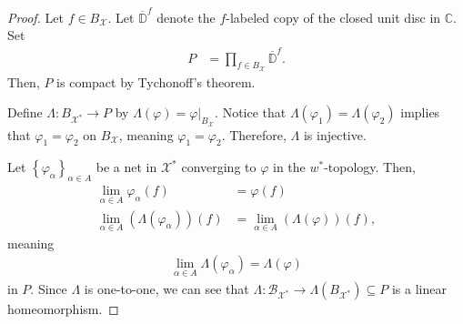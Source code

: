 \documentclass[12pt]{extarticle}
\newcommand{\C}{\mathbb{C}}
\newcommand{\set}[1]{\left\{#1\right\}}
\theoremstyle{plain}
\theoremstyle{definition}
\theoremstyle{note}
\renewcommand{\newline}{\hfill\break}
\begin{document}
\begin{proof}
  Let $f\in B_{\mathcal{X}}$. Let $\overline{\mathbb{D}}^{f}$ denote the $f$-labeled copy of the closed unit disc in $\C$. Set
  \begin{align*}
    P &= \prod_{f\in B_{\mathcal{X}}}\overline{\mathbb{D}}^{f}.
  \end{align*}
  Then, $P$ is compact by Tychonoff's theorem.\newline

  Define $\Lambda: B_{\mathcal{X}^{\ast}} \rightarrow P$ by $\Lambda(\varphi) = \varphi\vert_{B_{\mathcal{X}}}$. Notice that $\Lambda(\varphi_1) = \Lambda(\varphi_2)$ implies that $\varphi_1 = \varphi_2$ on $B_{\mathcal{X}}$, meaning $\varphi_1 = \varphi_2$. Therefore, $\Lambda$ is injective.\newline

  Let $\set{\varphi_{\alpha}}_{\alpha \in A}$ be a net in $\mathcal{X}^{\ast}$ converging to $\varphi$ in the $w^{\ast}$-topology. Then,
  \begin{align*}
    \lim_{\alpha \in A}\varphi_{\alpha}(f) &= \varphi(f)\\
    \lim_{\alpha \in A}\left(\Lambda\left(\varphi_{\alpha}\right)\right)(f) &= \lim_{\alpha \in A}\left(\Lambda\left(\varphi\right)\right)(f),
  \end{align*}
  meaning
  \begin{align*}
    \lim_{\alpha \in A}\Lambda\left(\varphi_{\alpha}\right) = \Lambda\left(\varphi\right)
  \end{align*}
  in $P$. Since $\Lambda$ is one-to-one, we can see that $\Lambda: \mathcal{B}_{\mathcal{X}^{\ast}} \rightarrow \Lambda\left(B_{\mathcal{X}^{\ast}}\right)\subseteq P$ is a linear homeomorphism.\newline


\end{proof}
\end{document}

